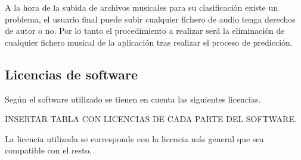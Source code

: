 A la hora de la subida de archivos musicales para su clasificación existe un problema, el usuario final puede subir cualquier fichero de audio tenga derechos de autor o no. Por lo tanto el procedimiento a realizar será la eliminación de cualquier fichero musical de la aplicación tras realizar el proceso de predicción.

\subsection{Licencias de software}

Según el software utilizado se tienen en cuenta las siguientes licencias.

INSERTAR TABLA CON LICENCIAS DE CADA PARTE DEL SOFTWARE.

La licencia utilizada se corresponde con la licencia más general que sea compatible con el resto.
